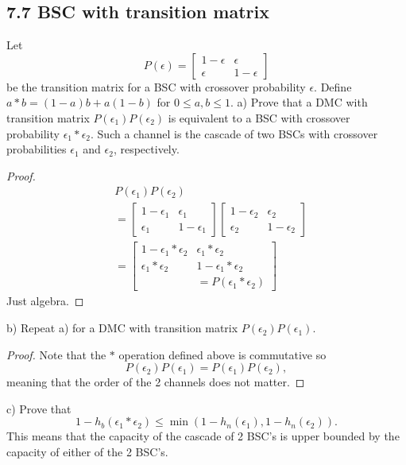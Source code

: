 \documentclass[../main.tex]{subfiles}
\begin{document}
\subsection*{7.7 BSC with transition matrix}
Let \[
P(\epsilon)=\begin{bmatrix}
    1-\epsilon & \epsilon \\
    \epsilon & 1-\epsilon
\end{bmatrix}
\] be the transition matrix for a BSC with crossover probability $\epsilon$. Define $a*b=(1-a)b+a(1-b)$ for $0\leq a,b\leq 1$.
\newline
a) Prove that a DMC with transition matrix $P(\epsilon_1)P(\epsilon_2)$ is equivalent to a BSC with crossover probability $\epsilon_1*\epsilon_2$. Such a channel is the cascade of two BSCs with crossover probabilities $\epsilon_1$ and $\epsilon_2$, respectively.
\begin{proof}
    \begin{align*}
        &P(\epsilon_1)P(\epsilon_2) \\
        &=\begin{bmatrix}
            1-\epsilon_1 & \epsilon_1\\
            \epsilon_1 & 1-\epsilon_1
        \end{bmatrix}\begin{bmatrix}
            1-\epsilon_2 & \epsilon_2\\
            \epsilon_2 & 1-\epsilon_2
        \end{bmatrix}\\
        &=\begin{bmatrix}
            1-\epsilon_1 *\epsilon_2& \epsilon_1*\epsilon_2\\
            \epsilon_1*\epsilon_2 & 1-\epsilon_1*\epsilon_2\\
            &=P(\epsilon_1*\epsilon_2)
        \end{bmatrix}
    \end{align*}
    Just algebra.
\end{proof}
b) Repeat a) for a DMC with transition matrix $P(\epsilon_2)P(\epsilon_1)$. \begin{proof}
    Note that the $*$ operation defined above is commutative so \[
    P(\epsilon_2)P(\epsilon_1)=P(\epsilon_1)P(\epsilon_2),
    \]
    meaning that the order of the 2 channels does not matter.
\end{proof}
c) Prove that \[1-h_b(\epsilon_1 * \epsilon_2)\leq \min(1-h_n(\epsilon_1), 1-h_n(\epsilon_2)).
\] This means that the capacity of the cascade of 2 BSC's is upper bounded by the capacity of either of the 2 BSC's.
\end{document}
